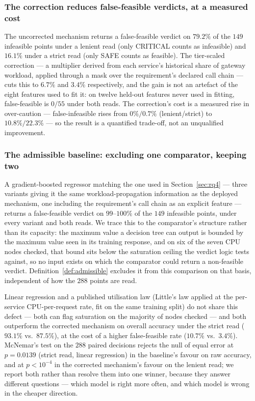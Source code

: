 \documentclass[journal, 10pt]{IEEEtran}
\begin{document}
\subsubsection{The correction reduces false-feasible verdicts, at a measured cost}
The uncorrected mechanism returns a false-feasible verdict on $79.2\%$ of the
$149$ infeasible points under a lenient read (only CRITICAL counts as
infeasible) and $16.1\%$ under a strict read (only SAFE counts as feasible).
The tier-scaled correction --- a multiplier derived from each service's
historical share of gateway workload, applied through a mask over the
requirement's declared call chain --- cuts this to $6.7\%$ and $3.4\%$
respectively, and the gain is not an artefact of the eight features used to
fit it: on twelve held-out features never used in fitting, false-feasible is
$0/55$ under both reads. The correction's cost is a measured rise in
over-caution --- false-infeasible rises from $0\%/0.7\%$ (lenient/strict) to
$10.8\%/22.3\%$ --- so the result is a quantified trade-off, not an
unqualified improvement.

\subsubsection{The admissible baseline: excluding one comparator, keeping two}
A gradient-boosted regressor matching the one used in Section~\ref{sec:rq4} ---
three variants giving it the same workload-propagation information as the
deployed mechanism, one including the requirement's call chain as an explicit
feature --- returns a false-feasible verdict on $99$--$100\%$ of the $149$
infeasible points, under every variant and both reads. We trace this to the
comparator's structure rather than its capacity: the maximum value a decision
tree can output is bounded by the maximum value seen in its training response,
and on six of the seven CPU nodes checked, that bound sits below the
saturation ceiling the verdict logic tests against, so no input exists on
which the comparator could return a non-feasible verdict. Definition~\ref{def:admissible}
excludes it from this comparison on that basis, independent of how the $288$
points are read.

Linear regression and a published utilisation law (Little's law applied at
the per-service CPU-per-request rate, fit on the same training split) do not
share this defect --- both can flag saturation on the majority of nodes
checked --- and both outperform the corrected mechanism on overall accuracy
under the strict read ($93.1\%$ vs.\ $87.5\%$), at the cost of a higher
false-feasible rate ($10.7\%$ vs.\ $3.4\%$). McNemar's test on the $288$
paired decisions rejects the null of equal error at $p{=}0.0139$ (strict read,
linear regression) in the baseline's favour on raw accuracy, and at
$p{<}10^{-4}$ in the corrected mechanism's favour on the lenient read; we
report both rather than resolve them into one winner, because they answer
different questions --- which model is right more often, and which model is
wrong in the cheaper direction.
\end{document}
